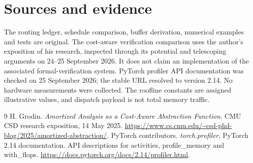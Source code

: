 \section*{Sources and evidence}
The routing ledger, schedule comparison, buffer derivation, numerical examples
and tests are original. The cost-aware verification comparison uses the author's
exposition of his research, inspected through its potential and telescoping
arguments on 24--25 September 2026. It does not claim an implementation of the
associated formal-verification system. PyTorch profiler API documentation was
checked on 25 September 2026; the stable URL resolved to version 2.14.
No hardware measurements were collected. The roofline constants are assigned
illustrative values, and dispatch payload is not total memory traffic.
\begingroup\let\chapter\section
\begin{thebibliography}{9}
 H. Grodin.
\emph{Amortized Analysis as a Cost-Aware Abstraction Function}.
CMU CSD research exposition, 14 May 2025.
\url{https://www.cs.cmu.edu/~csd-phd-blog/2025/amortized-abstraction/}.
 PyTorch contributors.
\emph{torch.profiler}, PyTorch 2.14 documentation.
API descriptions for activities, profile\_memory and with\_flops.
\url{https://docs.pytorch.org/docs/2.14/profiler.html}.
\end{thebibliography}\endgroup
